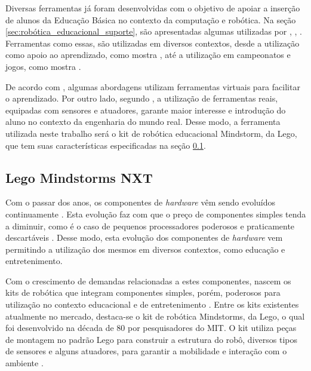 Diversas ferramentas já foram desenvolvidas com o objetivo de apoiar a inserção de alunos da Educação Básica no contexto da computação e robótica. Na seção \ref{sec:robótica_educacional_suporte}, são apresentadas algumas utilizadas por \cite{analiseFerramentaEnsinoComputacao}, \cite{projetoRoboticaMauricio}, \cite{simpleRobotsIntroductionEng}. Ferramentas como essas, são utilizadas em diversos contextos, desde a utilização como apoio ao aprendizado, como mostra \cite{teachingWithRoboticKit}, até a utilização em campeonatos e jogos, como mostra \cite{ciber-rato}. 

De acordo com \cite{analiseFerramentaEnsinoComputacao}, algumas abordagens utilizam ferramentas virtuais para facilitar o aprendizado. Por outro lado, segundo \cite{simpleMobile}, a utilização de ferramentas reais, equipadas com sensores e atuadores, garante maior interesse e introdução do aluno no contexto da engenharia do mundo real. Desse modo, a ferramenta utilizada neste trabalho será o kit de robótica educacional Mindstorm, da Lego, que tem suas características especificadas na seção \ref{sub:kit_mindstorm}.

\subsection{Lego Mindstorms NXT} %
\label{sub:kit_mindstorm}

Com o passar dos anos, os componentes de \textit{hardware} vêm sendo evoluídos continuamente \cite{teachingWithRoboticKit}. Esta evolução faz com que o preço de componentes simples tenda a diminuir, como é o caso de pequenos processadores poderosos e praticamente descartáveis \cite{teachingWithRoboticKit}. Desse modo, esta evolução dos componentes de \textit{hardware} vem permitindo a utilização dos mesmos em diversos contextos, como educação e entretenimento. 

Com o crescimento de demandas relacionadas a estes componentes, nascem os kits de robótica que integram componentes simples, porém, poderosos para utilização no contexto educacional e de entretenimento \cite{teachingWithRoboticKit}. Entre os kits existentes atualmente no mercado, destaca-se o kit de robótica Mindstorms, da Lego, o qual foi desenvolvido na década de 80 por pesquisadores do MIT. O kit utiliza peças de montagem no padrão Lego para construir a estrutura do robô, diversos tipos de sensores e alguns atuadores, para garantir a mobilidade e interação com o ambiente \cite{teachingWithRoboticKit}.


